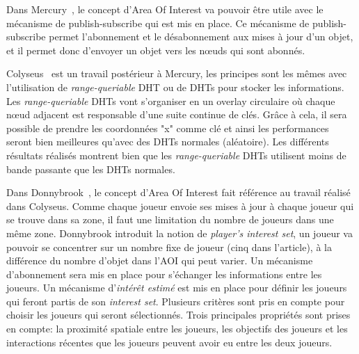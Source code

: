 	\par Dans Mercury~\cite{1015507}, le concept d'Area Of Interest va pouvoir être utile avec le mécanisme de publish-subscribe qui est mis en place. Ce mécanisme de publish-subscribe permet l'abonnement et le désabonnement aux mises à jour d'un objet, et il permet donc d'envoyer un objet vers les nœuds qui sont abonnés.\\
	\par Colyseus~\cite{1267692} est un travail postérieur à Mercury, les principes sont les mêmes avec l'utilisation de \textit{range-queriable} DHT ou de DHTs pour stocker les informations. Les \textit{range-queriable} DHTs vont s'organiser en un overlay circulaire où chaque nœud adjacent est responsable d'une suite continue de clés. Grâce à cela, il sera possible de prendre les coordonnées "x" comme clé et ainsi les performances seront bien meilleures qu'avec des DHTs normales (aléatoire). Les différents résultats réalisés montrent bien que les \textit{range-queriable} DHTs utilisent moins de bande passante que les DHTs normales. \\
	\par Dans Donnybrook~\cite{1403002}, le concept d'Area Of Interest fait référence au travail réalisé dans Colyseus. Comme chaque joueur envoie ses mises à jour à chaque joueur qui se trouve dans sa zone, il faut une limitation du nombre de joueurs dans une même zone. Donnybrook introduit la notion de \textit{player's interest set}, un joueur va pouvoir se concentrer sur un nombre fixe de joueur (cinq dans l'article), à la différence du nombre d'objet dans l'AOI qui peut varier. Un mécanisme d'abonnement sera mis en place pour s'échanger les informations entre les joueurs. Un mécanisme d'\textit{intérêt estimé} est mis en place pour définir les joueurs qui feront partis de son \textit{interest set}. Plusieurs critères sont pris en compte pour choisir les joueurs qui seront sélectionnés. Trois principales propriétés sont prises en compte: la proximité spatiale entre les joueurs, les objectifs des joueurs et les interactions récentes que les joueurs peuvent avoir eu entre les deux joueurs.\\
